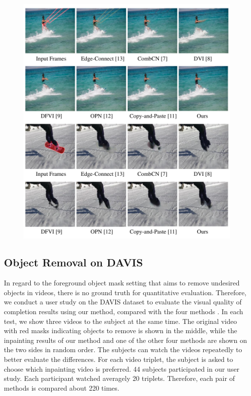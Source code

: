 \begin{figure}[!t]
	\centering
	\includegraphics[width=\columnwidth]{vis_forg} %
	\caption{}
	\label{vis_forg}
\end{figure}

\subsection{Object Removal on DAVIS}


In regard to the foreground object mask setting that aims to remove undesired objects in videos, there is no ground truth for quantitative evaluation. 
Therefore, we conduct a user study on the DAVIS dataset to evaluate the visual quality of completion results using our method, compared with the four methods \cite{nazeri2019edgeconnect,wang2019video,Kim_2019_CVPR1,Xu_2019_CVPR}.
%
In each test, we show three videos to the subject at the same time. The original video with red masks indicating objects to remove is shown in the middle, while the inpainting results of our method and one of the other four methods are shown on the two sides in random order.
%  
The subjects can watch the videos repeatedly to better evaluate the differences.
For each video triplet, the subject is asked to choose which inpainting video is preferred.
44 subjects participated in our user study. 
Each participant watched averagely 20 triplets. 
Therefore, each pair of methods is compared about 220 times.
 

